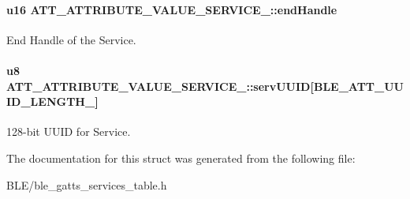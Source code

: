 \paragraph[{\texorpdfstring{end\+Handle}{endHandle}}]{\setlength{\rightskip}{0pt plus 5cm}u16 A\+T\+T\+\_\+\+A\+T\+T\+R\+I\+B\+U\+T\+E\+\_\+\+V\+A\+L\+U\+E\+\_\+\+S\+E\+R\+V\+I\+C\+E\+\_\+::end\+Handle}\hypertarget{struct_a_t_t___a_t_t_r_i_b_u_t_e___v_a_l_u_e___s_e_r_v_i_c_e__16_acfe1b006dd1bb2e377891178b931fbe2}{}\label{struct_a_t_t___a_t_t_r_i_b_u_t_e___v_a_l_u_e___s_e_r_v_i_c_e__16_acfe1b006dd1bb2e377891178b931fbe2}
End Handle of the Service. 
\paragraph[{\texorpdfstring{serv\+U\+U\+ID}{servUUID}}]{\setlength{\rightskip}{0pt plus 5cm}u8 A\+T\+T\+\_\+\+A\+T\+T\+R\+I\+B\+U\+T\+E\+\_\+\+V\+A\+L\+U\+E\+\_\+\+S\+E\+R\+V\+I\+C\+E\+\_\+::serv\+U\+U\+ID\mbox{[}{\bf B\+L\+E\+\_\+\+A\+T\+T\+\_\+\+U\+U\+I\+D\+\_\+\+L\+E\+N\+G\+T\+H\+\_}\mbox{]}}\hypertarget{struct_a_t_t___a_t_t_r_i_b_u_t_e___v_a_l_u_e___s_e_r_v_i_c_e__16_afeb4c4ef4af5be4330a4825e2f499230}{}\label{struct_a_t_t___a_t_t_r_i_b_u_t_e___v_a_l_u_e___s_e_r_v_i_c_e__16_afeb4c4ef4af5be4330a4825e2f499230}
128-\/bit U\+U\+ID for Service. 

The documentation for this struct was generated from the following file\+:\begin{DoxyCompactItemize}
\item 
B\+L\+E/ble\+\_\+gatts\+\_\+services\+\_\+table.\+h\end{DoxyCompactItemize}
